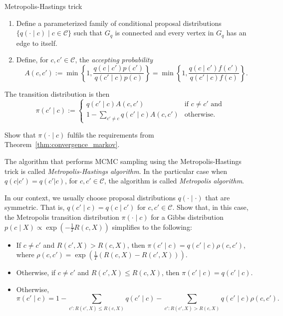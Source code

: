 \begin{definition}{Metropolis-Hastings trick}
\begin{enumerate}
\item Define a parameterized family of conditional proposal distributions
$\{q(\cdot \mid c) \mid c \in \mathcal{C}\}$ such that $G_q$ is connected and every vertex in $G_q$
has an edge to itself.
\item Define, for $c, c' \in \mathcal{C}$, the \emph{accepting probability}
%
\begin{equation}
A(c, c') := \min\left\{1, \frac{q(c \mid c')p(c')}{q(c' \mid c)p(c)}\right\} = \min\left\{1, \frac{q(c \mid c')f(c')}{q(c' \mid c)f(c)}\right\}.
\end{equation}
%
\end{enumerate}
%
The transition distribution is then
%
\begin{equation}
\pi(c' \mid c) := \begin{cases}
q(c' \mid c)A(c, c') & \text{if $c \neq c'$ and}\\
1 - \sum_{c' \neq c}q(c' \mid c)A(c, c') & \text{otherwise}.
\end{cases}
\end{equation}
%
\end{definition}

\begin{exercise}
Show that $\pi(\cdot \mid c)$ fulfils the requirements from Theorem~\ref{thm:convergence_markov}.
\end{exercise}

\begin{definition}
The algorithm that performs MCMC sampling using the Metropolis-Hastings trick is called \emph{Metropolis-Hastings algorithm}. In the particular case when $q(c | c') = q(c' | c)$, for $c, c' \in \mathcal{C}$, the algorithm is called \emph{Metropolis algorithm}.
\end{definition}

\begin{exercise}
In our context, we usually choose proposal distributions $q(\cdot \mid \cdot)$
that are symmetric. That is, $q(c' \mid c) = q(c \mid c')$ for $c, c' \in \mathcal{C}$. Show that,
in this case, the Metropolis transition distribution $\pi(\cdot \mid c)$ for a
Gibbs distribution $p(c \mid X) \propto \exp\left(-\frac{1}{T}R(c, X)\right)$ simplifies to the following:

\begin{itemize}
\item If $c \neq c'$ and $R(c', X) > R(c, X)$, then $\pi(c' \mid c) = q(c' \mid c)\rho(c, c')$, where $\rho(c, c') = \exp\left(\frac{1}{T}\left(R(c, X) - R(c', X)\right)\right)$.
\item Otherwise, if $c \neq c'$ and $R(c', X) \leq R(c, X)$, then $\pi(c' \mid c) = q(c' \mid c)$.
\item Otherwise,
%
\begin{equation}
\pi(c' \mid c) = 1 - \sum_{c' : R(c', X) \leq R(c, X)}q(c' \mid c) - \sum_{c': R(c', X) > R(c, X)}q(c' \mid c)\rho(c, c').
\end{equation}
%
\end{itemize}
\end{exercise}

